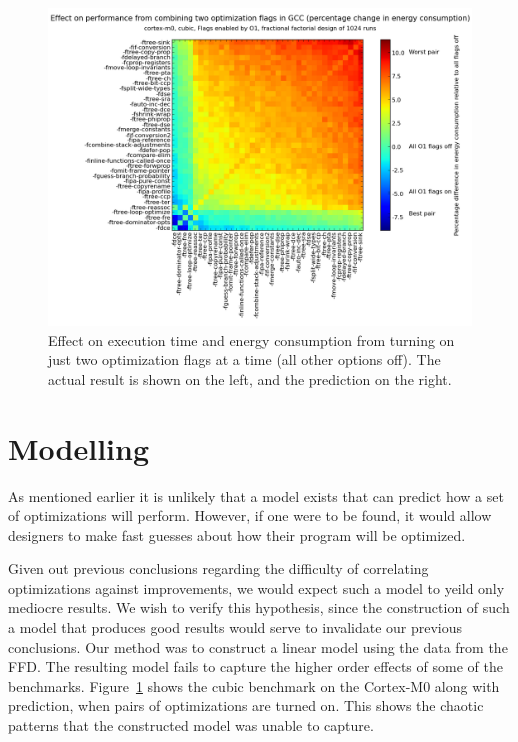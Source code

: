 \documentclass[twocolumn]{article}
\newcommand{\nsection}[1]{\section{\bfseries #1}}
\let\oldcaption\caption
\renewcommand{\caption}[1]{\oldcaption{\textup{#1}}}
\begin{document}
\begin{figure}
\begin{minipage}[l]{0.07\columnwidth}
    \end{minipage}
    \hfill
    \begin{minipage}[r]{0.95\columnwidth}
        \centering
		\includegraphics[width=0.9\linewidth, clip, trim= 8.8cm 0 7cm 2cm]{cortex-m0/o1cub_-7p5_10_pred.png}
    \end{minipage}
    \caption{Effect on execution time and energy consumption from turning on just two optimization flags at a time (all other options off). The actual result is shown on the left, and the prediction on the right.}
    \label{Fig:twoway_cubic}
\end{figure}


\nsection{Modelling}

As mentioned earlier it is unlikely that a model exists that can predict how a set of optimizations will perform. However, if one were to be found, it would allow designers to make fast guesses about how their program will be optimized.

Given out previous conclusions regarding the difficulty of correlating optimizations against improvements, we would expect such a model to yeild only mediocre results. We wish to verify this hypothesis, since the construction of such a model that produces good results would serve to invalidate our previous conclusions. Our method was to construct a linear model using the data from the FFD. The resulting model fails to capture the higher order effects of some of the benchmarks. Figure~\ref{Fig:twoway_cubic} shows the cubic benchmark on the Cortex-M0 along with prediction, when pairs of optimizations are turned on. This shows the chaotic patterns that the constructed model was unable to capture.
\end{document}
